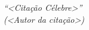 \begin{epigrafe}
	\vspace*{\fill}
	\begin{flushright}
		\textit{%
			``<Citação Célebre>''\\
			(<Autor da citação>)}
	\end{flushright}
\end{epigrafe}